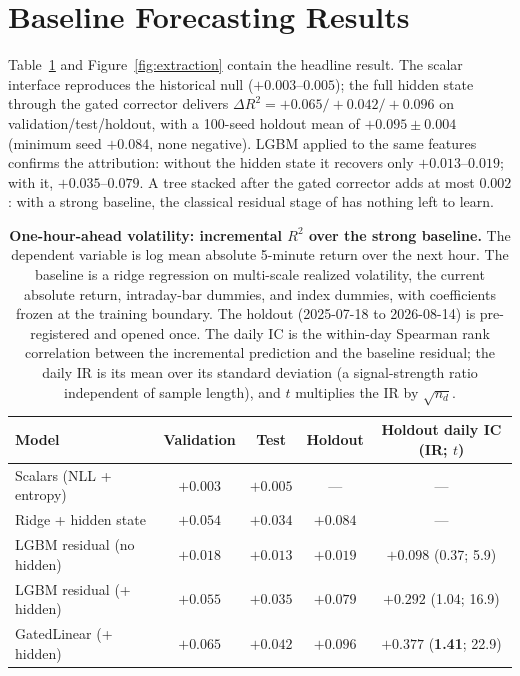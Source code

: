 \documentclass[12pt]{article}
\newcommand{\dR}{\Delta R^2}
\begin{document}
\section{Baseline Forecasting Results}\label{sec:baseline}
Table~\ref{tab:main} and Figure~\ref{fig:extraction} contain the headline
result. The scalar interface reproduces the historical null
($+0.003$--$0.005$); the full hidden state through the gated corrector
delivers $\dR = +0.065/+0.042/+0.096$ on validation/test/holdout, with a
100-seed holdout mean of $+0.095\pm0.004$ (minimum seed $+0.084$, none
negative). LGBM applied to the same features confirms the attribution:
without the hidden state it recovers only $+0.013$--$0.019$; with it,
$+0.035$--$0.079$. A tree stacked after the gated corrector adds at most
$0.002$: with a strong baseline, the classical residual stage of
\citet{dewage2026hybrid} has nothing left to learn.

\begin{table}[t]
\centering\small
\caption{\textbf{One-hour-ahead volatility: incremental $R^2$ over the strong
baseline.} The dependent variable is log mean absolute 5-minute return over
the next hour. The baseline is a ridge regression on multi-scale realized
volatility, the current absolute return, intraday-bar dummies, and index
dummies, with coefficients frozen at the training boundary. The holdout
(2025-07-18 to 2026-08-14) is pre-registered and opened once. The daily IC is
the within-day Spearman rank correlation between the incremental prediction
and the baseline residual; the daily IR is its mean over its standard deviation (a
signal-strength ratio independent of sample length), and $t$ multiplies the IR
by $\sqrt{n_d}$.}
\label{tab:main}
\vspace{6pt}
\begin{tabular}{lcccc}
\toprule
Model & Validation & Test & Holdout & Holdout daily IC (IR; $t$) \\
\midrule
Scalars (NLL + entropy) & $+0.003$ & $+0.005$ & --- & --- \\
Ridge + hidden state & $+0.054$ & $+0.034$ & $+0.084$ & --- \\
LGBM residual (no hidden) & $+0.018$ & $+0.013$ & $+0.019$ & $+0.098$ (0.37; 5.9) \\
LGBM residual (+ hidden) & $+0.055$ & $+0.035$ & $+0.079$ & $+0.292$ (1.04; 16.9) \\
GatedLinear (+ hidden) & $\mathbf{+0.065}$ & $\mathbf{+0.042}$ & $\mathbf{+0.096}$ & $\mathbf{+0.377}$ (\textbf{1.41}; 22.9) \\
\bottomrule
\end{tabular}
\end{table}
\end{document}
